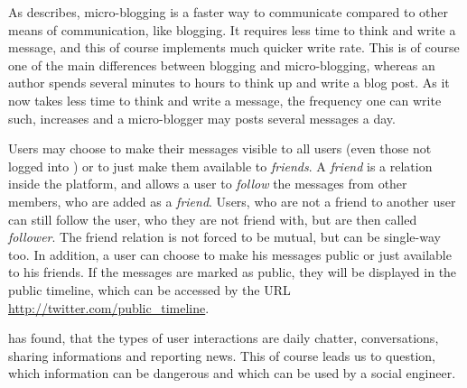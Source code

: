 As \cite{java2007} describes, micro-blogging is a faster way to communicate
compared to other means of communication, like blogging. It requires less time
to think and write a message, and this of course implements much quicker
\flqq{}write rate\frqq{}. This is of course one of the main differences
between blogging and micro-blogging, whereas an author spends several minutes
to hours to think up and write a blog post. As it now takes less time to think
and write a message, the frequency one can write such, increases and a
micro-blogger may posts several messages a day.

Users may choose to make their messages visible to all users (even those not
logged into \Twitter{}) or to just make them available to \textit{friends}. A
\textit{friend} is a relation inside the \Twitter{} platform, and allows a user
to \textit{follow} the messages from other members, who are added as a
\textit{friend}. Users, who are not a friend to another user can still follow
the user, who they are not friend with, but are then called \textit{follower}.
The friend relation is not forced to be mutual, but can be single-way too. In
addition, a user can choose to make his messages public or just available to
his friends. If the messages are marked as public, they will be displayed in
the public timeline, which can be accessed by the URL
\url{http://twitter.com/public_timeline}.

\cite{java2007} has found, that the types of user interactions are daily
chatter, conversations, sharing informations and reporting news. This of course
leads us to question, which information can be dangerous and which can be used
by a social engineer.


